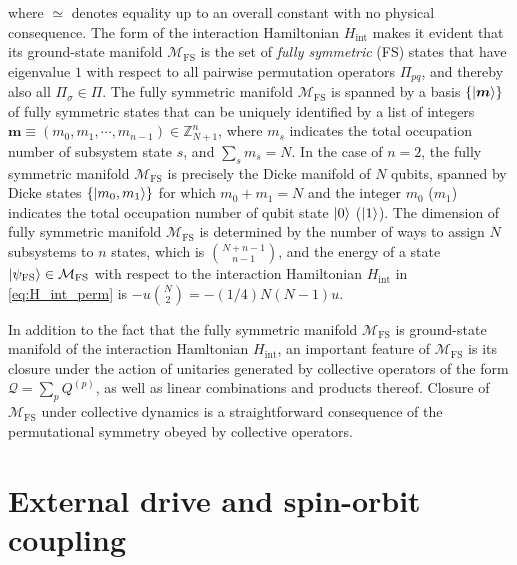 \documentclass[nofootinbib,notitlepage,11pt]{revtex4-2}
\renewcommand{\t}{\text} %
\newcommand{\p}[1]{\left(#1\right)} %
\renewcommand{\set}[1]{\left\{#1\right\}} %
\renewcommand{\v}{\bm} %
\newcommand{\1}{\mathds{1}}
\newcommand{\M}{\mathcal{M}}
\newcommand{\Q}{\mathcal{Q}}
\newcommand{\ZZ}{\mathbb{Z}}
\newcommand{\FS}{\text{FS}}
\begin{document}
where $\simeq$ denotes equality up to an overall constant with no
physical consequence.  The form of the interaction Hamiltonian
$H_{\t{int}}$ makes it evident that its ground-state manifold
$\M_{\FS}$ is the set of {\it fully symmetric} (FS) states that have
eigenvalue $1$ with respect to all pairwise permutation operators
$\Pi_{pq}$, and thereby also all $\Pi_\sigma\in\Pi$.  The fully
symmetric manifold $\M_\FS$ is spanned by a basis $\set{\ket{\v m}}$
of fully symmetric states that can be uniquely identified by a list of
integers $\v m\equiv\p{m_0,m_1,\cdots,m_{n-1}}\in\ZZ_{N+1}^n$, where
$m_s$ indicates the total occupation number of subsystem state $s$,
and $\sum_sm_s=N$.  In the case of $n=2$, the fully symmetric manifold
$\M_\FS$ is precisely the Dicke manifold\cite{dicke1954coherence} of
$N$ qubits, spanned by Dicke states $\set{\ket{m_0,m_1}}$ for which
$m_0+m_1=N$ and the integer $m_0$ ($m_1$) indicates the total
occupation number of qubit state $\ket{0}$ ($\ket{1}$).  The dimension
of fully symmetric manifold $\M_\FS$ is determined by the number of
ways to assign $N$ subsystems to $n$ states, which is
${N+n-1 \choose n-1}$, and the energy of a state
$\ket{\psi_\FS}\in\M_\FS$ with respect to the interaction Hamiltonian
$H_{\t{int}}$ in \eqref{eq:H_int_perm} is
$-u{N \choose 2}=-\p{1/4}N\p{N-1}u$.

In addition to the fact that the fully symmetric manifold $\M_\FS$ is
ground-state manifold of the interaction Hamltonian $H_{\t{int}}$, an
important feature of $\M_\FS$ is its closure under the action of
unitaries generated by collective operators of the form
$\Q=\sum_pQ^{(p)}$, as well as linear combinations and products
thereof.  Closure of $\M_\FS$ under collective dynamics is a
straightforward consequence of the permutational symmetry obeyed by
collective operators.

\section{External drive and spin-orbit coupling}
\label{sec:drive_SOC}
\end{document}
